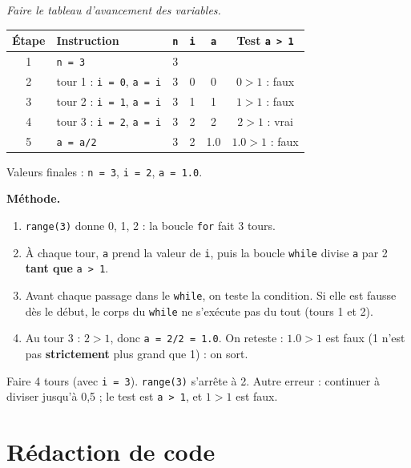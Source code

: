 \documentclass[addpoints, 11pt]{exam}
\newcommand{\enonce}[1]{\textit{#1}\par\smallskip}
\newcommand{\methode}{\par\smallskip\noindent\textbf{Méthode.}\ }
\newcommand{\code}[1]{\texttt{#1}}
\DeclareRobustCommand{\_}{\textunderscore\allowbreak}
\begin{document}
\begin{questions}
\question[4] \enonce{Faire le tableau d'avancement des variables.}
\begin{reponse}
\begin{center}
\begin{tabular}{|c|l|c|c|c|c|}
\hline
Étape & Instruction & \code{n} & \code{i} & \code{a} & Test \code{a > 1} \\ \hline
1 & \code{n = 3} & 3 & & & \\
2 & tour 1 : \code{i = 0}, \code{a = i} & 3 & 0 & 0 & $0 > 1$ : faux \\
3 & tour 2 : \code{i = 1}, \code{a = i} & 3 & 1 & 1 & $1 > 1$ : faux \\
4 & tour 3 : \code{i = 2}, \code{a = i} & 3 & 2 & 2 & $2 > 1$ : vrai \\
5 & \code{a = a/2} & 3 & 2 & 1.0 & $1.0 > 1$ : faux \\ \hline
\end{tabular}
\end{center}
Valeurs finales : \code{n = 3}, \code{i = 2}, \code{a = 1.0}.
\end{reponse}
\methode
\begin{enumerate}
  \item \code{range(3)} donne 0, 1, 2 : la boucle \code{for} fait 3 tours.
  \item À chaque tour, \code{a} prend la valeur de \code{i}, puis la boucle \code{while} divise \code{a} par 2 \textbf{tant que} \code{a > 1}.
  \item Avant chaque passage dans le \code{while}, on teste la condition. Si elle est fausse dès le début, le corps du \code{while} ne s'exécute pas du tout (tours 1 et 2).
  \item Au tour 3 : $2 > 1$, donc \code{a = 2/2 = 1.0}. On reteste : $1.0 > 1$ est faux (1 n'est pas \textbf{strictement} plus grand que 1) : on sort.
\end{enumerate}
\begin{erreur}
Faire 4 tours (avec \code{i = 3}). \code{range(3)} s'arrête à 2. Autre erreur : continuer à diviser jusqu'à 0,5 ; le test est \code{a > 1}, et $1 > 1$ est faux.
\end{erreur}

\section{Rédaction de code}


\end{questions}
\end{document}
